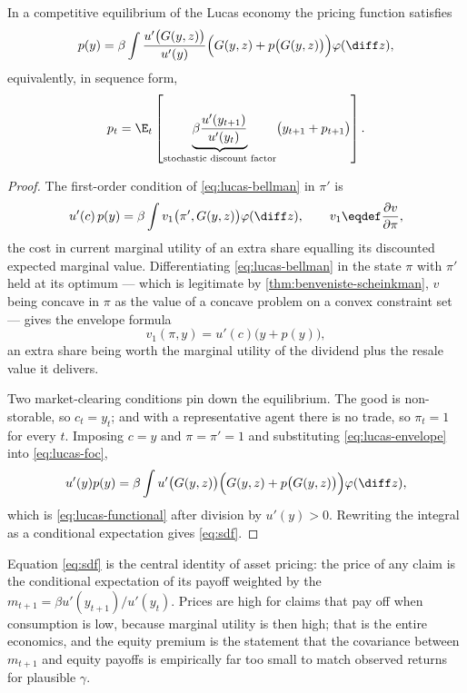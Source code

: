 \begin{theorem}\label{thm:lucas-pricing}
	In a competitive equilibrium of the Lucas economy the pricing function satisfies
	\begin{equation}\label{eq:lucas-functional}
		p(y)=\beta\int\frac{u'\bigl(G(y,z)\bigr)}{u'(y)}
		\Bigl(G(y,z)+p\bigl(G(y,z)\bigr)\Bigr)\varphi(\diff z),
	\end{equation}
	equivalently, in sequence form,
	\begin{equation}\label{eq:sdf}
		p_t=\E_t\left[\underbrace{\beta\frac{u'(y_{t+1})}{u'(y_t)}}_{\text{stochastic discount factor}}
			\bigl(y_{t+1}+p_{t+1}\bigr)\right].
	\end{equation}
\end{theorem}

\begin{proof}
	The first-order condition of \eqref{eq:lucas-bellman} in $\pi'$ is
	\begin{equation}\label{eq:lucas-foc}
		u'(c)\,p(y)=\beta\int v_1\bigl(\pi',G(y,z)\bigr)\varphi(\diff z),
		\qquad v_1\eqdef\frac{\partial v}{\partial\pi},
	\end{equation}
	the cost in current marginal utility of an extra share equalling its discounted
	expected marginal value. Differentiating \eqref{eq:lucas-bellman} in the state
	$\pi$ with $\pi'$ held at its optimum --- which is legitimate by
	\autoref{thm:benveniste-scheinkman}, $v$ being concave in $\pi$ as the value of
	a concave problem on a convex constraint set --- gives the envelope formula
	\begin{equation}\label{eq:lucas-envelope}
		v_1(\pi,y)=u'(c)\bigl(y+p(y)\bigr),
	\end{equation}
	an extra share being worth the marginal utility of the dividend plus the resale
	value it delivers.

	Two market-clearing conditions pin down the equilibrium. The good is
	non-storable, so $c_t=y_t$; and with a representative agent there is no trade, so
	$\pi_t=1$ for every $t$. Imposing $c=y$ and $\pi=\pi'=1$ and substituting
	\eqref{eq:lucas-envelope} into \eqref{eq:lucas-foc},
	\[
		u'(y)p(y)=\beta\int u'\bigl(G(y,z)\bigr)
		\Bigl(G(y,z)+p\bigl(G(y,z)\bigr)\Bigr)\varphi(\diff z),
	\]
	which is \eqref{eq:lucas-functional} after division by $u'(y)>0$. Rewriting the
	integral as a conditional expectation gives \eqref{eq:sdf}.
\end{proof}

Equation \eqref{eq:sdf} is the central identity of asset pricing: the price of
any claim is the conditional expectation of its payoff weighted by the
$m_{t+1}=\beta u'(y_{t+1})/u'(y_t)$. Prices are high for claims that pay off when
consumption is low, because marginal utility is then high; that is the entire
economics, and the equity premium is the statement that the covariance between
$m_{t+1}$ and equity payoffs is empirically far too small to match observed
returns for plausible $\gamma$.

